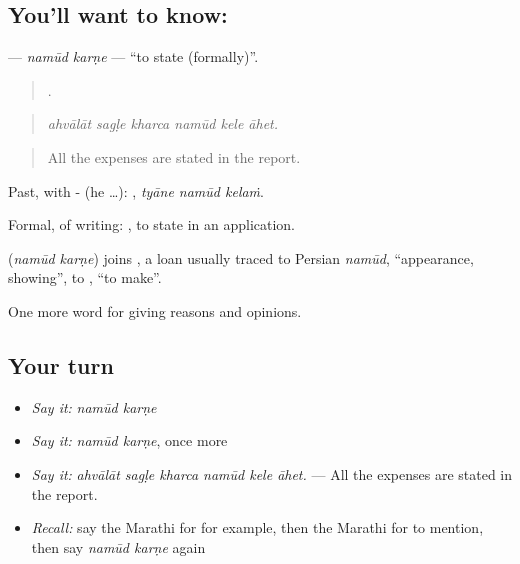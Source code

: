 \subsection*{You'll want to know:  }
\textbf{ } — \emph{namūd karṇe} — \textquotedblleft{}to state (formally)\textquotedblright{}.

\begin{quote}
     .
\end{quote}

\begin{quote}
\emph{ahvālāt sagḷe kharca namūd kele āhet.}
\end{quote}

\begin{quote}
All the expenses are stated in the report.
\end{quote}

Past, with - (he …):   , \emph{tyāne namūd kelaṁ}.

Formal, of writing:   , to state in an application.

\begin{cousinweb}
\textbf{ } (\emph{namūd karṇe}) joins , a loan usually traced to Persian \emph{namūd}, \textquotedblleft{}appearance, showing\textquotedblright{}, to , \textquotedblleft{}to make\textquotedblright{}.
\end{cousinweb}

\begin{grammarlens}[title={What you've built}]
One more word for giving reasons and opinions.
\end{grammarlens}

\subsection*{Your turn}
\begin{itemize}
\raggedright
  \item \emph{Say it:} \emph{namūd karṇe}
  \item \emph{Say it:} \emph{namūd karṇe}, once more
  \item \emph{Say it:} \emph{ahvālāt sagḷe kharca namūd kele āhet.} — All the expenses are stated in the report.
  \item \emph{Recall:} say the Marathi for for example, then the Marathi for to mention, then say \emph{namūd karṇe} again
\end{itemize}

